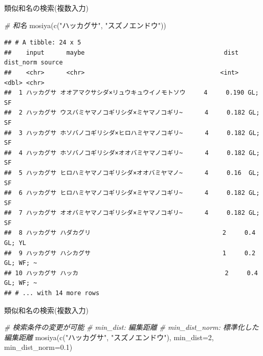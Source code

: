 \documentclass[
  a5paper,
  landscape,
  notitlepage]{report}
\newenvironment{Shaded}{\begin{snugshade}}{\end{snugshade}}
\newcommand{\AttributeTok}[1]{\textcolor[rgb]{0.77,0.63,0.00}{#1}}
\newcommand{\CommentTok}[1]{\textcolor[rgb]{0.56,0.35,0.01}{\textit{#1}}}
\newcommand{\DecValTok}[1]{\textcolor[rgb]{0.00,0.00,0.81}{#1}}
\newcommand{\FloatTok}[1]{\textcolor[rgb]{0.00,0.00,0.81}{#1}}
\newcommand{\FunctionTok}[1]{\textcolor[rgb]{0.00,0.00,0.00}{#1}}
\newcommand{\NormalTok}[1]{#1}
\newcommand{\StringTok}[1]{\textcolor[rgb]{0.31,0.60,0.02}{#1}}
\begin{document}
\newpage

\fontsize{32pt}{32pt}\selectfont

\begin{center}
類似和名の検索(複数入力)
\end{center}

\fontsize{14pt}{14pt}\selectfont

\begin{Shaded}
\begin{Highlighting}[]
  \CommentTok{\# 和名}
\FunctionTok{mosiya}\NormalTok{(}\FunctionTok{c}\NormalTok{(}\StringTok{"ハッカグサ"}\NormalTok{, }\StringTok{"スズノエンドウ"}\NormalTok{))}
\end{Highlighting}
\end{Shaded}

\begin{verbatim}
## # A tibble: 24 x 5
##    input      maybe                                      dist dist_norm source   
##    <chr>      <chr>                                     <int>     <dbl> <chr>    
##  1 ハッカグサ オオアマクサシダ×リュウキュウイノモトソウ     4     0.190 GL; SF   
##  2 ハッカグサ ウスバミヤマノコギリシダ×ミヤマノコギリ~      4     0.182 GL; SF   
##  3 ハッカグサ ホソバノコギリシダ×ヒロハミヤマノコギリ~      4     0.182 GL; SF   
##  4 ハッカグサ ホソバノコギリシダ×オオバミヤマノコギリ~      4     0.182 GL; SF   
##  5 ハッカグサ ヒロハミヤマノコギリシダ×オオバミヤマノ~      4     0.16  GL; SF   
##  6 ハッカグサ ヒロハミヤマノコギリシダ×ミヤマノコギリ~      4     0.182 GL; SF   
##  7 ハッカグサ オオバミヤマノコギリシダ×ミヤマノコギリ~      4     0.182 GL; SF   
##  8 ハッカグサ ハダカグリ                                    2     0.4   GL; YL   
##  9 ハッカグサ ハシカグサ                                    1     0.2   GL; WF; ~
## 10 ハッカグサ ハッカ                                        2     0.4   GL; WF; ~
## # ... with 14 more rows
\end{verbatim}

\newpage

\fontsize{32pt}{32pt}\selectfont

\begin{center}
類似和名の検索(複数入力)
\end{center}

\fontsize{14pt}{14pt}\selectfont

\begin{Shaded}
\begin{Highlighting}[]
  \CommentTok{\# 検索条件の変更が可能}
  \CommentTok{\# min\_dist: 編集距離}
  \CommentTok{\# min\_dist\_norm: 標準化した編集距離}
\FunctionTok{mosiya}\NormalTok{(}\FunctionTok{c}\NormalTok{(}\StringTok{"ハッカグサ"}\NormalTok{, }\StringTok{"スズノエンドウ"}\NormalTok{), }\AttributeTok{min\_dist=}\DecValTok{2}\NormalTok{, }\AttributeTok{min\_dist\_norm=}\FloatTok{0.1}\NormalTok{)}
\end{Highlighting}
\end{Shaded}
\end{document}
